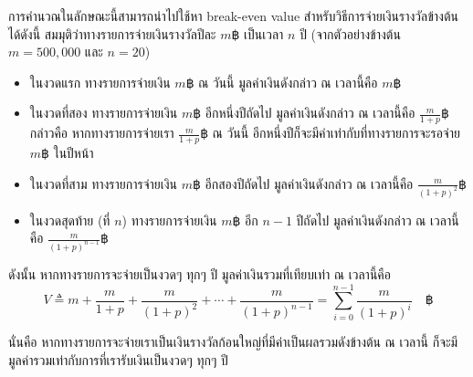การคำนวณในลักษณะนี้สามารถนำไปใช้หา break-even value สำหรับวิธีการจ่ายเงินรางวัลข้างต้นได้ดังนี้ \enskip สมมุติว่าทางรายการจ่ายเงินรางวัลปีละ $m฿$ เป็นเวลา $n$ ปี (จากตัวอย่างข้างต้น $m=500{,}000$ และ $n=20$)
\begin{itemize}
\item ในงวดแรก ทางรายการจ่ายเงิน $m฿$ ณ วันนี้ \enskip มูลค่าเงินดังกล่าว ณ เวลานี้คือ $m฿$
\item ในงวดที่สอง ทางรายการจ่ายเงิน $m฿$ อีกหนึ่งปีถัดไป \enskip มูลค่าเงินดังกล่าว ณ เวลานี้คือ $\frac{m}{1+p}฿$ \enskip กล่าวคือ หากทางรายการจ่ายเรา $\frac{m}{1+p}฿$ ณ วันนี้ อีกหนึ่งปีก็จะมีค่าเท่ากับที่ทางรายการจะรอจ่าย $m฿$ ในปีหน้า
\item ในงวดที่สาม ทางรายการจ่ายเงิน $m฿$ อีกสองปีถัดไป \enskip มูลค่าเงินดังกล่าว ณ เวลานี้คือ $\frac{m}{(1+p)^2}฿$
\item ในงวดสุดท้าย (ที่ $n$) ทางรายการจ่ายเงิน $m฿$ อีก $n-1$ ปีถัดไป \enskip มูลค่าเงินดังกล่าว ณ เวลานี้คือ $\frac{m}{(1+p)^{n-1}}฿$
\end{itemize}
ดังนั้น หากทางรายการจะจ่ายเป็นงวดๆ ทุกๆ ปี มูลค่าเงินรวมที่เทียบเท่า ณ เวลานี้คือ \[V\triangleq m+\frac{m}{1+p}+\frac{m}{(1+p)^2}+\cdots+\frac{m}{(1+p)^{n-1}}=\sum_{i=0}^{n-1}\frac{m}{(1+p)^i} \quad ฿\]

นั่นคือ หากทางรายการจะจ่ายเราเป็นเงินรางวัลก้อนใหญ่ที่มีค่าเป็นผลรวมดังข้างต้น ณ เวลานี้ ก็จะมีมูลค่ารวมเท่ากับการที่เรารับเงินเป็นงวดๆ ทุกๆ ปี
